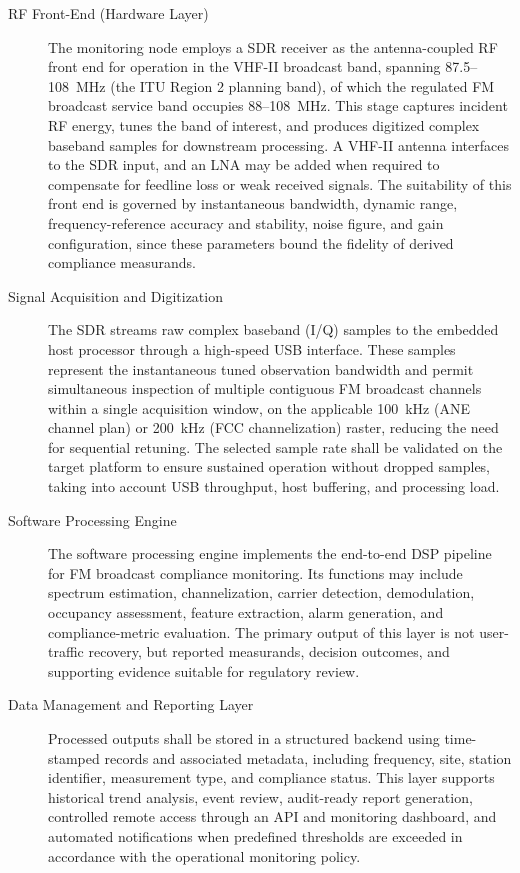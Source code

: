 \documentclass[11pt]{article}
\begin{document}
\begin{description}

\item[RF Front-End (Hardware Layer)] The monitoring node employs a SDR receiver as the antenna-coupled RF front end for operation in the VHF-II broadcast band, spanning 87.5--108~MHz (the ITU Region 2 planning band), of which the regulated FM broadcast service band occupies 88--108~MHz. This stage captures incident RF energy, tunes the band of interest, and produces digitized complex baseband samples for downstream processing. A VHF-II antenna interfaces to the SDR input, and an LNA may be added when required to compensate for feedline loss or weak received signals. The suitability of this front end is governed by instantaneous bandwidth, dynamic range, frequency-reference accuracy and stability, noise figure, and gain configuration, since these parameters bound the fidelity of derived compliance measurands.

\item[Signal Acquisition and Digitization] The SDR streams raw complex baseband (I/Q) samples to the embedded host processor through a high-speed USB interface. These samples represent the instantaneous tuned observation bandwidth and permit simultaneous inspection of multiple contiguous FM broadcast channels within a single acquisition window, on the applicable 100~kHz (ANE channel plan) or 200~kHz (FCC channelization) raster, reducing the need for sequential retuning. The selected sample rate shall be validated on the target platform to ensure sustained operation without dropped samples, taking into account USB throughput, host buffering, and processing load.

\item[Software Processing Engine] The software processing engine implements the end-to-end DSP pipeline for FM broadcast compliance monitoring. Its functions may include spectrum estimation, channelization, carrier detection, demodulation, occupancy assessment, feature extraction, alarm generation, and compliance-metric evaluation. The primary output of this layer is not user-traffic recovery, but reported measurands, decision outcomes, and supporting evidence suitable for regulatory review.

\item[Data Management and Reporting Layer] Processed outputs shall be stored in a structured backend using time-stamped records and associated metadata, including frequency, site, station identifier, measurement type, and compliance status. This layer supports historical trend analysis, event review, audit-ready report generation, controlled remote access through an API and monitoring dashboard, and automated notifications when predefined thresholds are exceeded in accordance with the operational monitoring policy.

\end{description}
\end{document}
